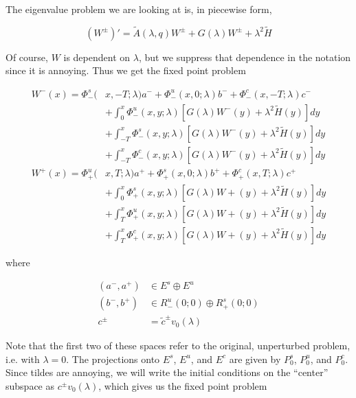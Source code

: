 \documentclass[12pt]{article}
\begin{document}
The eigenvalue problem we are looking at is, in piecewise form,

\[
(W^\pm)' = \tilde{A}(\lambda, q) W^\pm + G(\lambda)W^\pm + \lambda^2 \tilde{H}
\]

Of course, $W$ is dependent on $\lambda$, but we suppress that dependence in the notation since it is annoying. Thus we get the fixed point problem

\begin{align*}
W^-(x) = \Phi^s_-(&x, -T; \lambda)a^- + \Phi^u_-(x, 0; \lambda)b^- + \Phi^c_-(x, -T; \lambda)c^- \\
&+ \int_0^x \Phi^u_-(x, y; \lambda)[ G(\lambda)W^-(y) + \lambda^2 \tilde{H}(y) ] dy \\
&+ \int_{-T}^x \Phi^s_-(x, y; \lambda) [ G(\lambda)W^-(y) + \lambda^2 \tilde{H}(y) ] dy \\
&+ \int_{-T}^x \Phi^c_-(x, y; \lambda) [ G(\lambda)W^-(y) + \lambda^2 \tilde{H}(y) ]dy \\
W^+(x) = \Phi^u_+(&x, T; \lambda)a^+ + \Phi^s_+(x, 0; \lambda)b^+ + \Phi^c_+(x, T; \lambda)c^+ \\
&+ \int_0^x \Phi^s_+(x, y; \lambda) [ G(\lambda)W+(y) + \lambda^2 \tilde{H}(y) ] dy \\
&+ \int_T^x \Phi^u_+(x, y; \lambda) [ G(\lambda)W+(y) + \lambda^2 \tilde{H}(y) ] dy \\
&+ \int_T^x \Phi^c_+(x, y; \lambda) [ G(\lambda)W+(y) + \lambda^2 \tilde{H}(y) ] dy
\end{align*}

where

\begin{align*}
(a^-, a^+) &\in E^s \oplus E^u\\
(b^-, b^+) &\in R^u_-(0; 0) \oplus R^s_+(0; 0)\\
c^\pm &= \tilde{c}^\pm v_0(\lambda)
\end{align*}

Note that the first two of these spaces refer to the original, unperturbed problem, i.e. with $\lambda = 0$. The projections onto $E^s$, $E^u$, and $E^c$ are given by $P_0^s$, $P_0^u$, and $P_0^c$. Since tildes are annoying, we will write the initial conditions on the ``center'' subspace as $c^\pm v_0(\lambda)$, which gives us the fixed point problem
\end{document}
